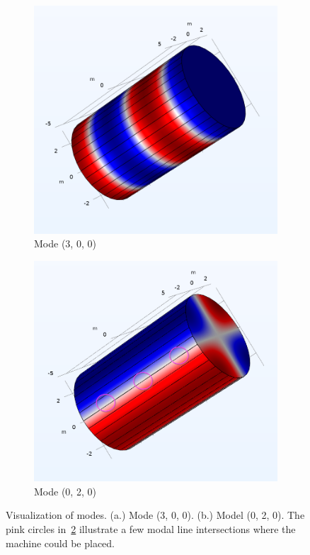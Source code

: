 {\begin{figure}[htbp]
    \centering
    \begin{subfigure}{0.5\textwidth}
        \includegraphics[width=\textwidth]{Mode Profile 51_5 Hz.png}
            \caption{Mode (3, 0, 0)}
            \label{fig:sub1}
    \end{subfigure}
    \vspace{0.25cm}
    \begin{subfigure}{0.5\textwidth}
        \includegraphics[width=\textwidth]{Mode Profile 55_8 Hz.png}
            \caption{Mode (0, 2, 0)}
            \label{fig:sub2}
    \end{subfigure}
    \vspace{0.5cm}
    \caption{Visualization of modes.  (a.) Mode (3, 0, 0).  (b.) Model (0, 2, 0).  The pink circles in~\ref{fig:sub2} illustrate a few modal line intersections where the machine could be placed.}
    \label{fig:modeVisualization}
\end{figure}






}
